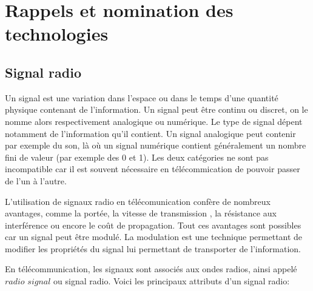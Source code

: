 \renewcommand{\leftmark}{NOMINATION DES TECHNOLOGIES}

\chapter{Rappels et nomination des technologies}

\section{Signal radio}

Un signal est une variation dans l'espace ou dans le temps d'une quantité physique contenant de l'information. Un signal peut être continu ou discret, on le nomme alors respectivement analogique ou numérique. Le type de signal dépent notamment de l'information qu'il contient. Un signal analogique peut contenir par exemple du son, là où un signal numérique contient généralement un nombre fini de valeur (par exemple des 0 et 1).
Les deux catégories ne sont pas incompatible car il est souvent nécessaire en télécommication de pouvoir passer de l'un à l'autre.\cite{test}

\vspace{0.1cm}

L'utilisation de signaux radio en télécomunication confère de nombreux avantages, comme la portée, la vitesse de transmission , la résistance aux interférence ou encore le coût de propagation. Tout ces avantages sont possibles car un signal peut être modulé. La modulation est une technique permettant de modifier les propriétés du signal lui permettant de transporter de l'information.

\newpage

En télécommunication, les signaux sont associés aux ondes radios, ainsi appelé $radio$ $signal$ ou signal radio. Voici les principaux attributs d'un signal radio: 

\vspace{0.1cm}


